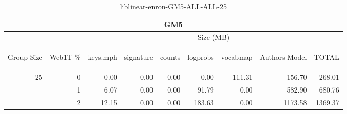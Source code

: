 \begin{center}
\begin{table}[htbp]
\begin{tabular}{ | r | r | r | r | r | r | r | r | r |}
\hline
\multicolumn{9}{|c|}{GM5}\\
\hline
 & & \multicolumn{7}{|c|}{Size (MB)}\\ \cline{3-9}
\begin{sideways}Group Size\end{sideways} & \begin{sideways}Web1T \% \end{sideways} & \begin{sideways}keys.mph\end{sideways} & \begin{sideways}signature\end{sideways} & \begin{sideways}counts\end{sideways} & \begin{sideways}logprobs\end{sideways} & \begin{sideways}vocabmap\end{sideways} & \begin{sideways}Authors Model \end{sideways} & \begin{sideways}TOTAL\end{sideways}\\
\hline
\multirow{2}{*}{25}
 & 0 & 0.00 & 0.00 & 0.00 & 0.00 & 111.31 & 156.70 & 268.01\\ \cline{2-9}
 & 1 & 6.07 & 0.00 & 0.00 & 91.79 & 0.00 & 582.90 & 680.76\\ \cline{2-9}
 & 2 & 12.15 & 0.00 & 0.00 & 183.63 & 0.00 & 1173.58 & 1369.37\\ \cline{2-9}
\hline
\end{tabular}
\caption{liblinear-enron-GM5-ALL-ALL-25}
\label{table:liblinear-enron-GM5-ALL-ALL-25}
\end{table}
\end{center}

